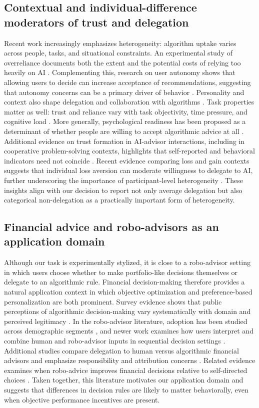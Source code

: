 \documentclass[a4paper, 12pt, fleqn]{article}
\theoremstyle{definition}
\begin{document}
\subsection{Contextual and individual-difference moderators of trust and delegation}
Recent work increasingly emphasizes heterogeneity: algorithm uptake varies across people, tasks, and situational constraints. An experimental study of overreliance documents both the extent and the potential costs of relying too heavily on AI \citep{Klingbeil2024}. Complementing this, research on user autonomy shows that allowing users to decide can increase acceptance of recommendations, suggesting that autonomy concerns can be a primary driver of behavior \citep{Fink2024}. Personality and context also shape delegation and collaboration with algorithms \citep{Ferraz2025}. Task properties matter as well: trust and reliance vary with task objectivity, time pressure, and cognitive load \citep{Yang2025}. More generally, psychological readiness has been proposed as a determinant of whether people are willing to accept algorithmic advice at all \citep{Kim2026}. Additional evidence on trust formation in AI-advisor interactions, including in cooperative problem-solving contexts, highlights that self-reported and behavioral indicators need not coincide \citep{Schreibelmayr2025}. Recent evidence comparing loss and gain contexts suggests that individual loss aversion can moderate willingness to delegate to AI, further underscoring the importance of participant-level heterogeneity \citep{Werner2026}. These insights align with our decision to report not only average delegation but also categorical non-delegation as a practically important form of heterogeneity.

\subsection{Financial advice and robo-advisors as an application domain}
Although our task is experimentally stylized, it is close to a robo-advisor setting in which users choose whether to make portfolio-like decisions themselves or delegate to an algorithmic rule. Financial decision-making therefore provides a natural application context in which objective optimization and preference-based personalization are both prominent. Survey evidence shows that public perceptions of algorithmic decision-making vary systematically with domain and perceived legitimacy \citep{Aysolmaz2023}. In the robo-advisor literature, adoption has been studied across demographic segments \citep{Figa-Talamanca2022}, and newer work examines how users interpret and combine human and robo-advisor inputs in sequential decision settings \citep{Mahmud2025}. Additional studies compare delegation to human versus algorithmic financial advisors and emphasize responsibility and attribution concerns \citep{Ismagilova2025}. Related evidence examines when robo-advice improves financial decisions relative to self-directed choices \citep{Lambrecht2023}. Taken together, this literature motivates our application domain and suggests that differences in decision rules are likely to matter behaviorally, even when objective performance incentives are present.
\end{document}
